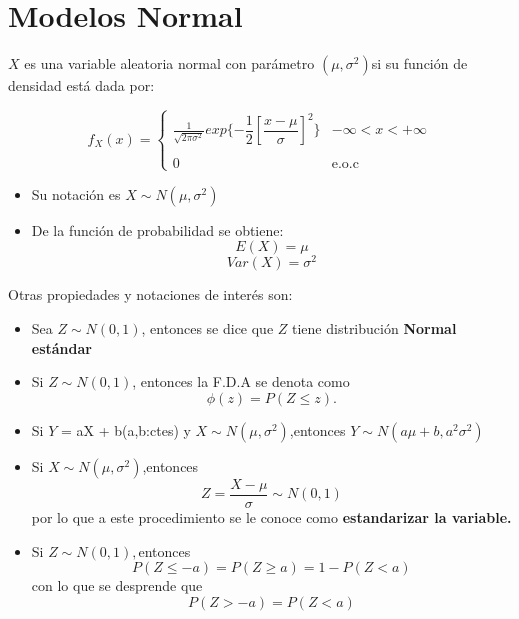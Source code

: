 \documentclass[12pt,twocolumn,a4paper]{report}
\begin{document}
\section*{Modelos Normal}
$X$ es una variable aleatoria normal con parámetro $(\mu,\sigma^2)$si su función de densidad está dada por: 

\begin{equation*}
f_X(x)= \left\{ \begin{array}{lc}
             \frac{1}{\sqrt{2 \pi \sigma^2}}exp\{-\dfrac{1}{2}[\dfrac{x-\mu}{\sigma}]^2\}  & -\infty < x < +\infty \\
             \\ 0 & \text{e.o.c} 
             \end{array}
   \right.
\end{equation*}
\begin{itemize}
\setlength\itemsep{0.001cm}
\item{Su notación es $X \sim N(\mu,\sigma ^2)$}
\item{De la función de probabilidad se obtiene:
$$
E(X) = \mu 
$$
$$
Var(X) = \sigma ^2
$$}
\end{itemize}

Otras propiedades y notaciones de interés son: 
\begin{itemize}
\setlength\itemsep{0.001cm}
\item{Sea $Z \sim N(0,1)$, entonces se dice que $Z$ tiene distribución \textbf{Normal estándar}}
\item{Si $Z \sim N(0,1)$, entonces la F.D.A se denota como 
$$
\phi (z) = P(Z \leq z).
$$}
\item{Si $Y$ = aX + b(a,b:ctes) y $X \sim N(\mu, \sigma^2)$,entonces $Y \sim N(a\mu + b, a^2  \sigma ^2)$}
\item{Si $X \sim N(\mu ,\sigma ^2)$,entonces 
$$
Z = \frac{X- \mu }{\sigma} \sim N(0,1)
$$
por lo que a este procedimiento se le conoce como \textbf{estandarizar la variable.}}
\item{Si $Z \sim N(0,1), $entonces
$$
P(Z \leq -a) = P(Z \geq a) = 1 - P(Z <a)
$$
con lo que se desprende que 
$$
P(Z > -a) = P(Z < a)
$$}
\end{itemize}
\end{document}
